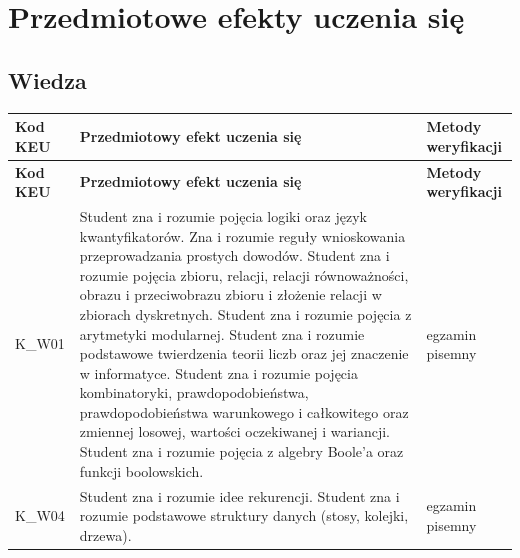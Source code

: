 \documentclass[12pt, a4paper]{article}
\newcommand{\thdrule}{\noalign{\global\setlength{\extrarowheight}{0pt}}}
\newcommand{\thdend}{\noalign{\global\setlength{\extrarowheight}{3pt}}}
\begin{document}
\section{Przedmiotowe efekty uczenia się}

\subsection*{Wiedza}
{\scriptsize
\begin{longtable}{m{1.6cm}m{9.0cm}m{4.2cm}}
\thdrule\toprule
\rowcolor{pjatkRed} {\color{white}\footnotesize\textbf{\vphantom{Ag}Kod KEU}} & {\color{white}\footnotesize\textbf{\vphantom{Ag}Przedmiotowy efekt uczenia się}} & {\color{white}\footnotesize\textbf{\vphantom{Ag}Metody weryfikacji}} \\
\midrule\thdend
\endfirsthead
\thdrule\toprule
\rowcolor{pjatkRed} {\color{white}\footnotesize\textbf{\vphantom{Ag}Kod KEU}} & {\color{white}\footnotesize\textbf{\vphantom{Ag}Przedmiotowy efekt uczenia się}} & {\color{white}\footnotesize\textbf{\vphantom{Ag}Metody weryfikacji}} \\
\midrule\thdend
\endhead
  \rowcolor{tableRowLight} K\_W01 & Student zna i rozumie pojęcia logiki oraz język kwantyfikatorów. Zna i rozumie reguły wnioskowania przeprowadzania prostych dowodów. Student zna i rozumie  pojęcia zbioru, relacji, relacji równoważności, obrazu i przeciwobrazu zbioru i złożenie relacji w zbiorach dyskretnych. Student zna i rozumie pojęcia z arytmetyki modularnej. Student zna i rozumie podstawowe twierdzenia teorii liczb oraz jej znaczenie w informatyce. Student zna i rozumie  pojęcia kombinatoryki, prawdopodobieństwa, prawdopodobieństwa warunkowego i całkowitego oraz zmiennej losowej, wartości oczekiwanej i wariancji. Student zna i rozumie  pojęcia z algebry Boole’a oraz funkcji boolowskich. & egzamin pisemny \\
  \rowcolor{tableRowAlt} K\_W04 & Student zna i rozumie idee rekurencji. Student zna i rozumie podstawowe struktury danych (stosy, kolejki, drzewa). & egzamin pisemny \\
\bottomrule
\end{longtable}}
\end{document}
